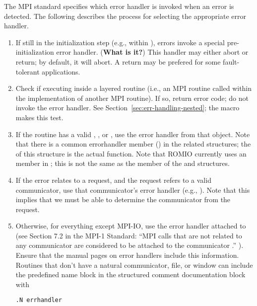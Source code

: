 \documentclass{article}
\begin{document}
The MPI standard specifies which error handler is invoked when an error is
detected.  The following describes the process for selecting the appropriate
error handler.

\begin{enumerate}
\item If still in the initialization step (e.g., within
), errors invoke a special pre-initialization error
handler. (\textbf{What is it?})  This handler may either abort or
return; by default, it will abort. 
A return may be prefered for some fault-tolerant applications.

\item Check if executing inside a layered routine (i.e., an MPI routine called
  within the implementation of another MPI routine).  If so, return error
  code; do not invoke the error handler.  See
  Section~\ref{sec:err-handling-nested}; the  macro makes
  this test.

\item If the routine has a valid , , or
  , use the error handler from that object.  Note that there is
  a common errorhandler member () in the related structures;
  the  of this structure is the actual function.
  Note that ROMIO currently uses an  member
  in ; this is not the same as the  member
  of the  and  structures.

\item If the error relates to a request, and the request refers to a valid
  communicator, use that communicator's error handler (e.g., ).
  Note that this implies that we must be able to determine the communicator
  from the request.

\item Otherwise, for everything except MPI-IO, use the error handler attached
  to   
  (see Section 7.2 in the MPI-1 Standard: ``MPI calls that are not related to
  any communicator are considered to be attached to the communicator
  .'' ).  Ensure that the manual pages on error handlers
  include this information.  Routines that don't have a natural
communicator, file, or window can include the predefined name block
 in the structured comment documentation block with
\begin{verbatim}
.N errhandler
\end{verbatim}


\end{enumerate}
\end{document}
